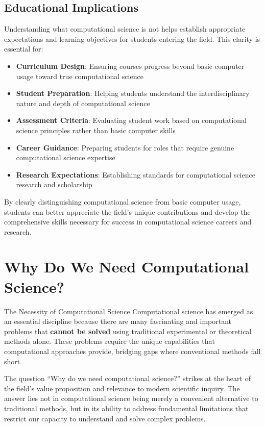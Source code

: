 \subsection{Educational Implications}

Understanding what computational science is not helps establish appropriate expectations and learning objectives for students entering the field. This clarity is essential for:

\begin{itemize}
    \item \textbf{Curriculum Design}: Ensuring courses progress beyond basic computer usage toward true computational science
    \item \textbf{Student Preparation}: Helping students understand the interdisciplinary nature and depth of computational science
    \item \textbf{Assessment Criteria}: Evaluating student work based on computational science principles rather than basic computer skills
    \item \textbf{Career Guidance}: Preparing students for roles that require genuine computational science expertise
    \item \textbf{Research Expectations}: Establishing standards for computational science research and scholarship
\end{itemize}

By clearly distinguishing computational science from basic computer usage, students can better appreciate the field's unique contributions and develop the comprehensive skills necessary for success in computational science careers and research.

\section{Why Do We Need Computational Science?}

\begin{conceptcard}{The Necessity of Computational Science}
Computational science has emerged as an essential discipline because there are many fascinating and important problems that \textbf{cannot be solved} using traditional experimental or theoretical methods alone. These problems require the unique capabilities that computational approaches provide, bridging gaps where conventional methods fall short.
\end{conceptcard}

The question ``Why do we need computational science?'' strikes at the heart of the field's value proposition and relevance to modern scientific inquiry. The answer lies not in computational science being merely a convenient alternative to traditional methods, but in its ability to address fundamental limitations that restrict our capacity to understand and solve complex problems.

